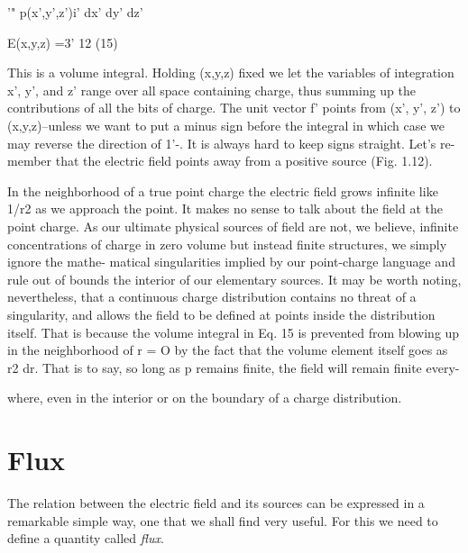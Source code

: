 '" p(x',y',z')i' dx' dy' dz'

E(x,y,z) =3' 12 (15)

This is a volume integral. Holding (x,y,z) fixed we let the variables
of integration x', y', and z' range over all space containing charge,
thus summing up the contributions of all the bits of charge. The
unit vector f' points from (x', y', z') to (x,y,z)--unless we want to put
a minus sign before the integral in which case we may reverse the
direction of 1'-. It is always hard to keep signs straight. Let's re-
member that the electric field points away from a positive source
(Fig. 1.12).

In the neighborhood of a true point charge the electric field grows
infinite like 1/r2 as we approach the point. It makes no sense to talk
about the field at the point charge. As our ultimate physical sources
of field are not, we believe, infinite concentrations of charge in zero
volume but instead finite structures, we simply ignore the mathe-
matical singularities implied by our point-charge language and rule
out of bounds the interior of our elementary sources. It may be
worth noting, nevertheless, that a continuous charge distribution
contains no threat of a singularity, and allows the field to be defined
at points inside the distribution itself. That is because the volume
integral in Eq. 15 is prevented from blowing up in the neighborhood
of r = O by the fact that the volume element itself goes as r2 dr. That
is to say, so long as p remains finite, the field will remain finite every-

where, even in the interior or on the boundary of a charge
distribution.


\section{Flux}

The relation between the electric field and its sources can be
expressed in a remarkable simple way, one that we shall find very
useful. For this we need to define a quantity called \emph{flux}.

